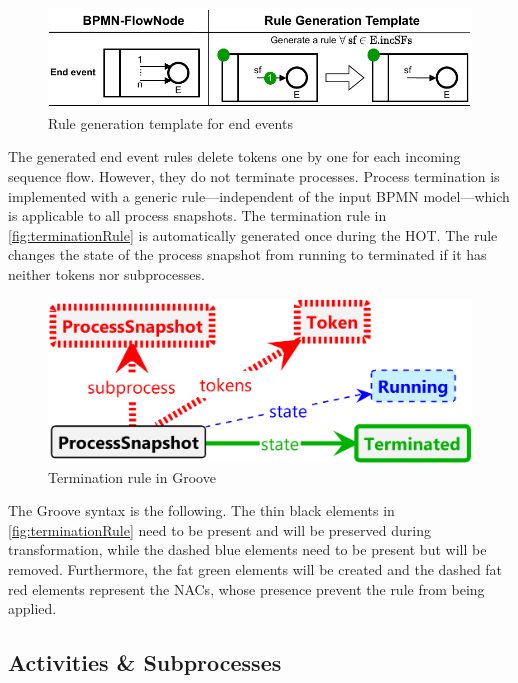 \documentclass{lmcs} %
\begin{document}
\begin{figure}[ht]
    \centering
    \includegraphics[width=1\textwidth]{images/end_template.pdf}
    \caption{Rule generation template for end events}
    \label{fig:endTemplate}
\end{figure}
    
The generated end event rules delete tokens one by one for each incoming sequence flow.
However, they do not terminate processes.
Process termination is implemented with a generic rule---independent of the input BPMN model---which is applicable to all process snapshots.
The termination rule in \autoref{fig:terminationRule} is automatically generated once during the HOT.
The rule changes the state of the process snapshot from running to terminated if it has neither tokens nor subprocesses.

\begin{figure}[ht]
    \centering
    \includegraphics[width=.6\textwidth]{images/terminate_groove.png}
    \caption{Termination rule in Groove}
    \label{fig:terminationRule}
\end{figure}

The Groove syntax is the following.
The thin black elements in \autoref{fig:terminationRule} need to be present and will be preserved during transformation, while the dashed blue elements need to be present but will be removed.
Furthermore, the fat green elements will be created and the dashed fat red elements represent the NACs, whose presence prevent the rule from being applied.

\subsection{Activities \& Subprocesses}
\end{document}
